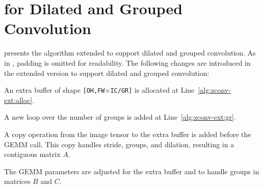 \section{\algname for Dilated and Grouped Convolution}
\label{sec:zconv-alg-ext}

 presents the \algname algorithm extended to support dilated and grouped convolution.
As in , padding is omitted for readability.
The following changes are introduced in the extended version to support dilated and grouped convolution: 
\begin{enumerate*}[label=(\roman*)] 
    \item An extra buffer of shape \texttt{[OH,FW$\times$IC/GR]} is allocated at Line~\ref{alg:zconv-ext:alloc}.
    \item A new loop over the number of groups is added at Line~\ref{alg:zconv-ext:gr}.
    \item A copy operation from the image tensor to the extra buffer is added before the GEMM call. 
    This copy handles stride, groups, and dilation, resulting in a contiguous matrix $A$.
    \item The GEMM parameters are adjusted for the extra buffer and to handle groups in matrices $B$ and $C$.
\end{enumerate*}

